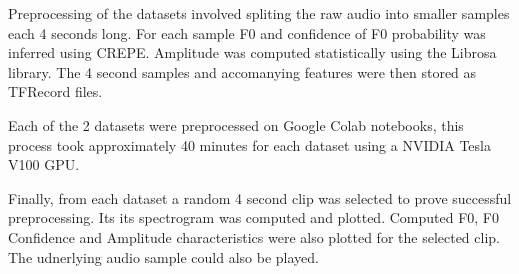 Preprocessing of the datasets involved spliting the raw audio into smaller samples each 4 seconds long. For each sample F0 and confidence of F0 probability was inferred using CREPE\cite{CREPE}. Amplitude was computed statistically using the Librosa library\cite{LibrosaPip}. The 4 second samples and accomanying features were then stored as TFRecord files.

Each of the 2 datasets were preprocessed on Google Colab notebooks, this process took approximately 40 minutes for each dataset using a NVIDIA Tesla V100 GPU.

Finally, from each dataset a random 4 second clip was selected to prove successful preprocessing. Its its spectrogram was computed and plotted. Computed F0, F0 Confidence and Amplitude characteristics were also plotted for the selected clip. The udnerlying audio sample could also be played.
